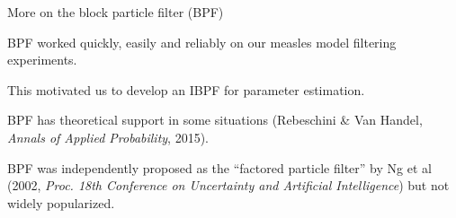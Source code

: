 \documentclass{beamer}
\begin{document}
\begin{frame}{More on the block particle filter (BPF)}

\bi
\item BPF worked quickly, easily and reliably on our measles model filtering experiments.

\item This motivated us to develop an IBPF for parameter estimation.
   
\item BPF has theoretical support in some situations (Rebeschini \& Van Handel, {\it Annals of Applied Probability}, 2015).

\item BPF was independently proposed as the ``factored particle filter'' by Ng et al (2002, {\it Proc. 18th Conference on Uncertainty and Artificial Intelligence}) but not widely popularized.

\ei

\end{frame}
\end{document}
